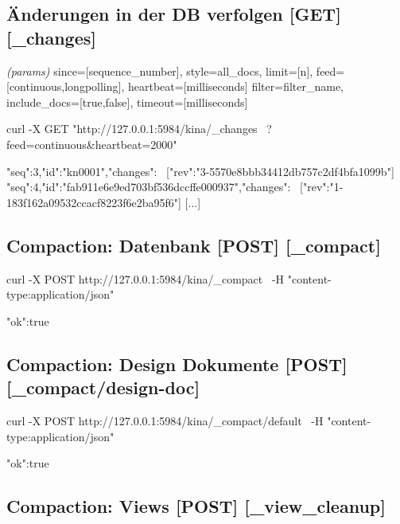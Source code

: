 \documentclass[19pt,landscape,twocolumn]{article}
\newcommand{\htmlverb}[1]{{[}\textbf{{#1}}{]}}
\newcommand{\brackets}[1]{{[}{#1}{]}}
\newcommand{\setparskip}{\setlength{\parskip}{-6mm}}
\newcommand{\resetparskip}{\setlength{\parskip}{1mm}}
\begin{document}
\subsection{Änderungen in der DB verfolgen \htmlverb{GET} \htmlverb{\_changes}}
\emph{(params)} since=\brackets{sequence\_number}, style=all\_docs, limit=\brackets{n}, \newline
feed=\brackets{continuous,longpolling}, heartbeat=\brackets{milliseconds} \newline
filter=filter\_name, include\_docs=\brackets{true,false}, timeout=\brackets{milliseconds}

\begin{code}
curl -X GET "http://127.0.0.1:5984/kina/_changes \
  ?feed=continuous&heartbeat=2000"
\end{code}
\setparskip
\begin{response}
{"seq":3,"id":"kn0001","changes": \
  [{"rev":"3-5570e8bbb34412db757c2df4bfa1099b"}]}
{"seq":4,"id":"fab911e6e9ed703bf536dccffe000937","changes": \ 
  [{"rev":"1-183f162a09532ccacf8223f6e2ba95f6"}]}
[...]
\end{response}
\resetparskip

\subsection{Compaction: Datenbank \htmlverb{POST} \htmlverb{\_compact}}

\begin{code}
curl -X POST http://127.0.0.1:5984/kina/_compact \
  -H "content-type:application/json"
\end{code}
\setparskip
\begin{response}
{"ok":true}
\end{response}
\resetparskip

\subsection{Compaction: Design Dokumente \htmlverb{POST} \htmlverb{\_compact/design-doc}}

\begin{code}
curl -X POST http://127.0.0.1:5984/kina/_compact/default \
  -H "content-type:application/json"
\end{code}
\setparskip
\begin{response}
{"ok":true}
\end{response}
\resetparskip

\subsection{Compaction: Views \htmlverb{POST} \htmlverb{\_view\_cleanup}}
\end{document}

